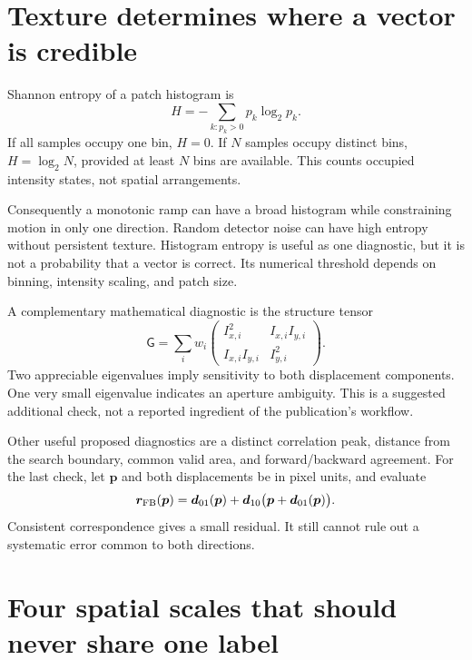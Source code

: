 \documentclass[11pt]{article}
\newcommand{\disp}{\bm{d}}
\begin{document}
\section{Texture determines where a vector is credible}

Shannon entropy of a patch histogram is
\begin{equation}
 H=-\sum_{k:p_k>0}p_k\log_2p_k.
\end{equation}
If all samples occupy one bin, $H=0$. If $N$ samples occupy distinct bins,
$H=\log_2N$, provided at least $N$ bins are available. This counts occupied
intensity states, not spatial arrangements.

Consequently a monotonic ramp can have a broad histogram while constraining
motion in only one direction. Random detector noise can have high entropy
without persistent texture. Histogram entropy is useful as one diagnostic,
but it is not a probability that a vector is correct. Its numerical threshold
depends on binning, intensity scaling, and patch size.

A complementary mathematical diagnostic is the structure tensor
\begin{equation}
 \mathsf{G}=\sum_i w_i
 \begin{pmatrix}I_{x,i}^2&I_{x,i}I_{y,i}\\
 I_{x,i}I_{y,i}&I_{y,i}^2\end{pmatrix}.
\end{equation}
Two appreciable eigenvalues imply sensitivity to both displacement
components. One very small eigenvalue indicates an aperture ambiguity.
This is a suggested additional check, not a reported ingredient of the
publication's workflow.

Other useful proposed diagnostics are a distinct correlation peak, distance
from the search boundary, common valid area, and forward/backward agreement.
For the last check, let $\bm{p}$ and both displacements be in pixel units,
and evaluate
\begin{equation}
 \bm{r}_{\rm FB}(\bm{p})=\disp_{01}(\bm{p})
 +\disp_{10}\bigl(\bm{p}+\disp_{01}(\bm{p})\bigr).
\end{equation}
Consistent correspondence gives a small residual. It still cannot rule out
a systematic error common to both directions.

\section{Four spatial scales that should never share one label}
\end{document}
